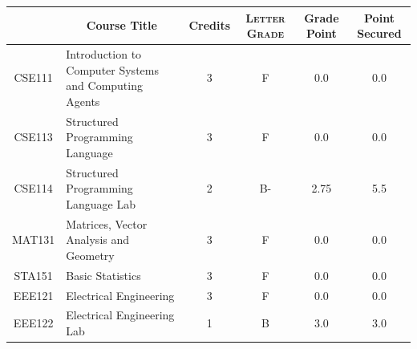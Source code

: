 \documentclass[11pt]{article}
\newcommand*{\numtwo}[1]{\pgfmathprintnumber[
                    fixed, precision=2, fixed zerofill=true]{#1}}
\begin{document}
                \begin{center}
                    \renewcommand{\arraystretch}{1.08}
                    
                \begin{tabular}{|c|l|c|>{\scshape}c|c|c|}
                \hline  \rule[-1ex]{0pt}{3.5ex} {\centering{\bf Course Code}} &  \multicolumn{1}{c|}{\textbf{Course Title}}  & {\bf Credits} & {\bf Letter Grade} & {\bf Grade Point} & {\bf Point Secured}  \\ 
                \hline   CSE111 &  Introduction to Computer Systems and Computing Agents		 & 3 & F & 0.0 & 0.0 \\ %
                \hline   CSE113 &  Structured Programming Language		 & 3 & F & 0.0 & 0.0 \\ %
                \hline   CSE114 &  Structured Programming Language Lab		 & 2 & B- & 2.75 & 5.5 \\ %
                \hline   MAT131 &  Matrices, Vector Analysis and Geometry		 & 3 & F & 0.0 & 0.0 \\ %
                \hline   STA151 &  Basic Statistics		 & 3 & F & 0.0 & 0.0 \\ %
                \hline   EEE121 &  Electrical Engineering		 & 3 & F & 0.0 & 0.0 \\ %
                \hline   EEE122 &  Electrical Engineering Lab		 & 1 & B & 3.0 & 3.0 \\ %

\hline                %
                \end{tabular}
                \end{center}
                \renewcommand{\arraystretch}{1.03}
\end{document}
